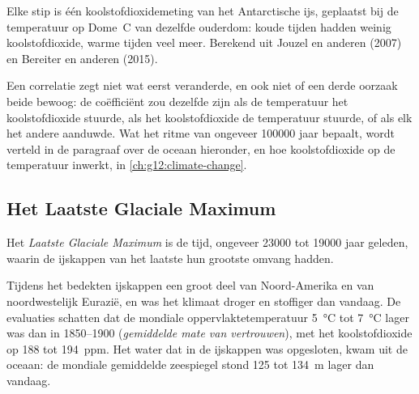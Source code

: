 \begin{omfigure}

{\small Elke stip is één koolstofdioxidemeting van het Antarctische ijs,
geplaatst bij de temperatuur op Dome~C van dezelfde ouderdom: koude tijden hadden weinig koolstofdioxide,
warme tijden veel meer. Berekend uit Jouzel en anderen (2007) en
Bereiter en anderen (2015).}
\end{omfigure}

Een correlatie zegt niet wat eerst veranderde, en ook niet of een derde oorzaak
beide bewoog: de coëfficiënt zou dezelfde zijn als de temperatuur het koolstofdioxide
stuurde, als het koolstofdioxide de temperatuur stuurde, of als elk het andere aanduwde.
Wat het ritme van ongeveer \num{100000} jaar bepaalt, wordt verteld in de paragraaf over
de oceaan hieronder, en hoe koolstofdioxide op de temperatuur inwerkt, in
\cref{ch:g12:climate-change}.

\subsection{Het Laatste Glaciale Maximum}

\begin{definition}\label{def:g12:past-climates:lgm}
Het \emph{Laatste Glaciale Maximum} is de tijd, ongeveer
\num{23000} tot \num{19000} jaar geleden, waarin de ijskappen van het laatste
 hun grootste omvang hadden.
\end{definition}

Tijdens het  bedekten ijskappen een groot deel van Noord-Amerika en van
noordwestelijk Eurazië, en was het klimaat droger en stoffiger dan vandaag. De
evaluaties schatten dat de mondiale oppervlaktetemperatuur \qty{5}{\degreeCelsius}
tot \qty{7}{\degreeCelsius} lager was dan in 1850--1900 (\emph{gemiddelde mate van vertrouwen}),
met het koolstofdioxide op 188 tot \qty{194}{ppm}. Het water dat in de ijskappen
was opgesloten, kwam uit de oceaan: de mondiale gemiddelde zeespiegel stond 125 tot \qty{134}{m}
lager dan vandaag.

